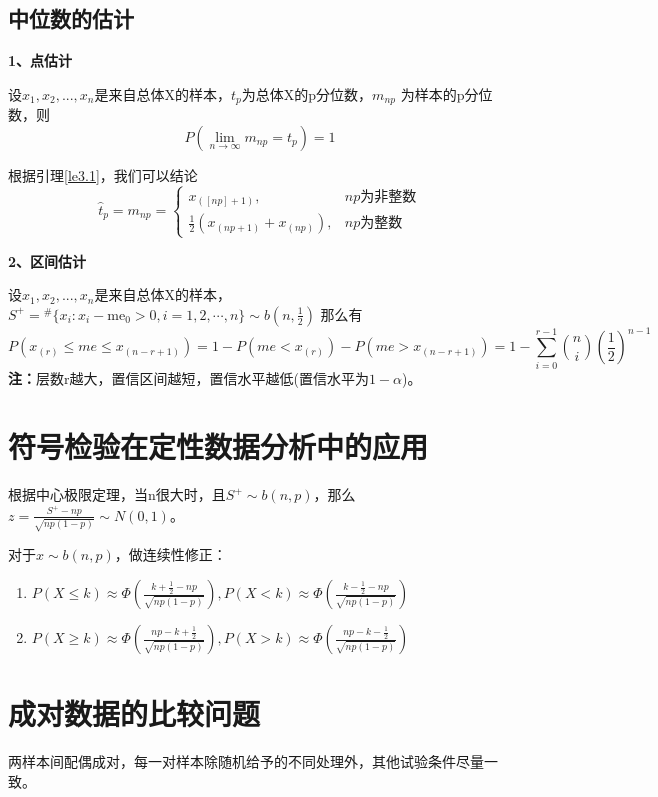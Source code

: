 \documentclass[lang=cn,10pt]{elegantbook}
\begin{document}
\subsection{中位数的估计}
\textbf{1、点估计}

\begin{lemma}\label{le3.1}
    设$x_1,x_2,...,x_n$是来自总体X的样本，$t_p$为总体X的p分位数，$m_{np}$
    为样本的p分位数，则
    \begin{equation}
        P(\lim_{n \to \infty} m_{np} = t_p ) = 1
    \end{equation}
\end{lemma}
根据引理\ref{le3.1}，我们可以结论
\begin{equation}
    \hat{t}_p = m_{np} = \begin{cases}
        x_{([np]+1)},                 & np\text{为非整数} \\
        \frac12(x_{(np+1)}+x_{(np)}), & np\text{为整数}
    \end{cases}
\end{equation}

\textbf{2、区间估计}

设$x_1,x_2,...,x_n$是来自总体X的样本，$S^+ =
    {}^{\#}\{x_i:x_i-\text{me}_0>0,i=1,2,\cdots,n\}\sim b(n,\frac12)$
那么有
\begin{equation}
    P(x_{(r)}\leq me \leq x_{(n-r+1)}) =1-P(me < x_{(r)}) -P(me > x_{(n-r+1)})
    = 1-\sum_{i=0}^{r-1}\binom{n}{i}(\frac{1}{2})^{n-1}
\end{equation}
\textbf{注：}层数r越大，置信区间越短，置信水平越低(置信水平为$1-\alpha$)。

\section{符号检验在定性数据分析中的应用}
根据中心极限定理，当n很大时，且$S^+ \sim b(n,p)$，那么$z=\frac{S^+ - np}{\sqrt{np(1-p)}}\sim N(0,1)$。

对于$x\sim b(n,p)$，做连续性修正：
\begin{enumerate}[1、]
    \item $P(X\leq k)\approx\Phi(\frac{k+\frac12-np}{\sqrt{np(1-p)}}),
              P(X< k)\approx\Phi(\frac{k-\frac12-np}{\sqrt{np(1-p)}})$
    \item $P(X\geq k)\approx\Phi(\frac{np-k+\frac12}{\sqrt{np(1-p)}}),
              P(X> k)\approx\Phi(\frac{np-k-\frac12}{\sqrt{np(1-p)}})$
\end{enumerate}

\section{成对数据的比较问题}
\begin{definition}[配对数据]
    两样本间配偶成对，每一对样本除随机给予的不同处理外，其他试验条件尽量一致。
\end{definition}
\end{document}
